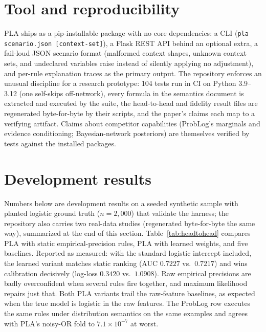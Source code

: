 \documentclass[10pt]{article}
\begin{document}
\section{Tool and reproducibility}\label{sec:tool}
PLA ships as a pip-installable package with no core dependencies: a CLI
(\texttt{pla scenario.json [context-set]}), a Flask REST API behind an
optional extra, a fail-loud JSON scenario format (malformed context
shapes, unknown context sets, and undeclared variables raise instead of
silently applying no adjustment), and per-rule explanation traces as the
primary output. The repository enforces an unusual discipline for a
research prototype: 104 tests run in CI on Python 3.9--3.12 (one
self-skips off-network), every formula
in the semantics document is extracted and executed by the suite, the
head-to-head and fidelity result files are regenerated byte-for-byte by
their scripts, and the paper's claims each map to a verifying artifact.
Claims about competitor capabilities (ProbLog's marginals and evidence
conditioning; Bayesian-network posteriors) are themselves verified by
tests against the installed packages.

\section{Development results}\label{sec:results}
Numbers below are development results on a seeded synthetic sample with
planted logistic ground truth ($n{=}2{,}000$) that validate the harness;
the repository also carries two real-data studies (regenerated
byte-for-byte the same way), summarized at the end of this section. Table~\ref{tab:headtohead} compares PLA with static
empirical-precision rules, PLA with learned weights, and five baselines.
Reported as measured: with the standard logistic intercept included,
the learned variant matches static ranking (AUC $0.7227$ vs.\ $0.7217$)
and wins calibration decisively (log-loss $0.3420$ vs.\ $1.0908$).
Raw empirical precisions are badly overconfident when several rules fire
together, and maximum likelihood repairs just that. Both PLA
variants trail the raw-feature baselines, as expected when the true model
is logistic in the raw features. The ProbLog row executes the same rules
under distribution semantics on the same examples and agrees with
PLA's noisy-OR fold to $7.1\times 10^{-7}$ at worst.
\end{document}
